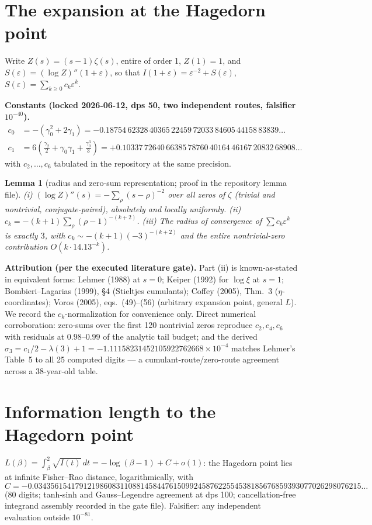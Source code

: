 \documentclass[11pt]{article}
\newtheorem{lemma}{Lemma}
\newcommand{\eps}{\varepsilon}
\begin{document}
\section{The expansion at the Hagedorn point}
Write $Z(s)=(s-1)\zeta(s)$, entire of order 1, $Z(1)=1$, and $S(\eps)=(\log Z)''(1+\eps)$, so that
$I(1+\eps)=\eps^{-2}+S(\eps)$, $S(\eps)=\sum_{k\ge0}c_k\eps^k$.

\textbf{Constants (locked 2026-06-12, dps 50, two independent routes, falsifier $10^{-40}$).}
\begin{align*}
c_0&=-(\gamma_0^2+2\gamma_1)=-0.18754\,62328\,40365\,22459\,72033\,84605\,44158\,83839\ldots\\
c_1&=6\left(\tfrac{\gamma_2}{2}+\gamma_0\gamma_1+\tfrac{\gamma_0^3}{3}\right)
=+0.10337\,72640\,66385\,78760\,40164\,46167\,20832\,68908\ldots
\end{align*}
with $c_2,\dots,c_6$ tabulated in the repository at the same precision.

\begin{lemma}[radius and zero-sum representation; proof in the repository lemma file]
(i) $(\log Z)''(s)=-\sum_\rho (s-\rho)^{-2}$ over all zeros of $\zeta$ (trivial and nontrivial,
conjugate-paired), absolutely and locally uniformly. (ii) $c_k=-(k+1)\sum_\rho(\rho-1)^{-(k+2)}$.
(iii) The radius of convergence of $\sum c_k\eps^k$ is exactly $3$, with
$c_k\sim-(k+1)(-3)^{-(k+2)}$ and the entire nontrivial-zero contribution $O(k\cdot 14.13^{-k})$.
\end{lemma}

\textbf{Attribution (per the executed literature gate).} Part (ii) is known-as-stated in equivalent
forms: Lehmer (1988) at $s=0$; Keiper (1992) for $\log\xi$ at $s=1$; Bombieri--Lagarias (1999),
\S4 (Stieltjes cumulants); Coffey (2005), Thm.~3 ($\eta$-coordinates); Voros (2005), eqs.~(49)--(56)
(arbitrary expansion point, general $L$). We record the $c_k$-normalization for convenience only.
Direct numerical corroboration: zero-sums over the first 120 nontrivial zeros reproduce $c_2,c_4,c_6$
with residuals at $0.98$--$0.99$ of the analytic tail budget; and the derived
$\sigma_3=c_1/2-\lambda(3)+1=-1.11158231452105922762668\times10^{-4}$ matches Lehmer's Table~5 to
all 25 computed digits --- a cumulant-route/zero-route agreement across a 38-year-old table.

\section{Information length to the Hagedorn point}
$L(\beta)=\int_\beta^2\sqrt{I(t)}\,dt=-\log(\beta-1)+C+o(1)$: the Hagedorn point lies at infinite
Fisher--Rao distance, logarithmically, with
\[
C=-0.03435615417912198608311088145844761509924587622554538185676859393077026298076215\!\ldots
\]
(80 digits; tanh-sinh and Gauss--Legendre agreement at dps 100; cancellation-free integrand assembly
recorded in the gate file). Falsifier: any independent evaluation outside $10^{-81}$.
\end{document}
